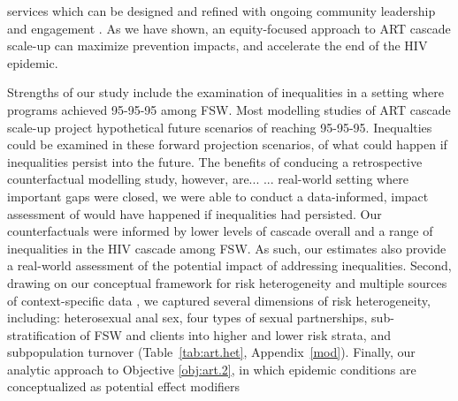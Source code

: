 services which can be designed and refined with ongoing community leadership and engagement
\cite{Chikwari2018,Mlambo2019,Comins2022}.
As we have shown, an equity-focused approach to ART cascade scale-up
can maximize prevention impacts, and accelerate the end of the HIV epidemic.
\par
Strengths of our study include the examination of inequalities in a setting
where programs achieved 95-95-95 among FSW. 
Most modelling studies of ART cascade scale-up
project hypothetical future scenarios of reaching 95-95-95. 
Inequalties could be examined in these forward projection scenarios, of what could happen 
if inequalities persist into the future. The benefits of conducing a retrospective counterfactual modelling study, however, are... %
... real-world setting where
important gaps were closed, we were able to conduct a data-informed, 
impact assessment of would have happened if inequalities had persisted.
Our counterfactuals were informed by lower levels of cascade overall and a range of inequalities in the HIV cascade among FSW.
As such, our estimates also provide a real-world assessment of the potential impact of addressing inequalities.
Second, drawing on our conceptual framework for risk heterogeneity \cite[Table~1]{Knight2022sr}
and multiple sources of context-specific data
\cite{SDHS2006,SHIMS1,SHIMS2,Baral2014,EswKP2014,EswIBBS2022},
we captured several dimensions of risk heterogeneity, including:
heterosexual anal sex,
four types of sexual partnerships,
sub-stratification of FSW and clients into higher and lower risk strata,
and subpopulation turnover
(Table~\ref{tab:art.het}, Appendix~\ref{mod}). %
Finally, our analytic approach to Objective \ref{obj:art.2},
in which epidemic conditions are conceptualized as potential effect modifiers

